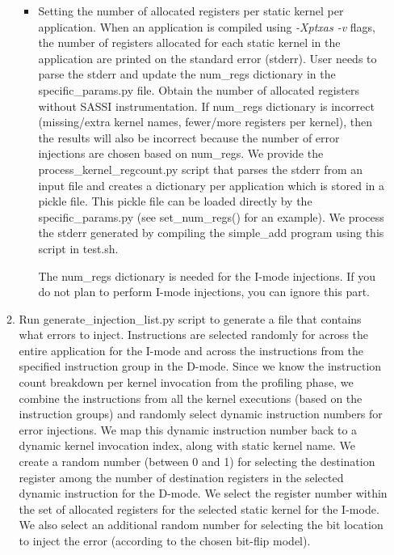 \begin{enumerate}
\begin{enumerate}
\begin{itemize}
				\item Setting the number of allocated registers per static kernel per
				application. When an application is compiled using {\it -Xptxas -v}
				flags, the number of registers allocated for each static kernel in the
				application are printed on the standard error (stderr).  User needs to
				parse the stderr and update the num\_regs dictionary in the
				specific\_params.py file. Obtain the number of allocated registers
				without SASSI instrumentation.  If num\_regs dictionary is incorrect
				(missing/extra kernel names, fewer/more registers per kernel), then the
				results will also be incorrect because the number of error injections
				are chosen based on num\_regs.  We provide the
				process\_kernel\_regcount.py script that parses the stderr from an
				input file and creates a dictionary per application which is stored in
				a pickle file. This pickle file can be loaded directly by the
				specific\_params.py (see set\_num\_regs() for an example). We process
				the stderr generated by compiling the simple\_add program using this
				script in test.sh.
				
				The num\_regs dictionary is needed for the I-mode injections. If you do
				not plan to perform I-mode injections, you can ignore this part.  

			
			\end{itemize}
			\label{step71}

			\item Run generate\_injection\_list.py script to generate a file that
			contains what errors to inject. Instructions are selected randomly for
			across the entire application for the I-mode and across the instructions
			from the specified instruction group in the D-mode. Since we know the
			instruction count breakdown per kernel invocation from the profiling
			phase, we combine the instructions from all the kernel executions (based
			on the instruction groups) and randomly select dynamic instruction
			numbers for error injections. We map this dynamic instruction number back
			to a dynamic kernel invocation index, along with static kernel name. We
			create a random number (between 0 and 1) for selecting the destination
			register among the number of destination registers in the selected
			dynamic instruction for the D-mode. We select the register number within
			the set of allocated registers for the selected static kernel for the
			I-mode. We also select an additional random number for selecting the
			bit location to inject the error (according to the chosen bit-flip model). 
			\label{step72}
		\end{enumerate}


\end{enumerate}
